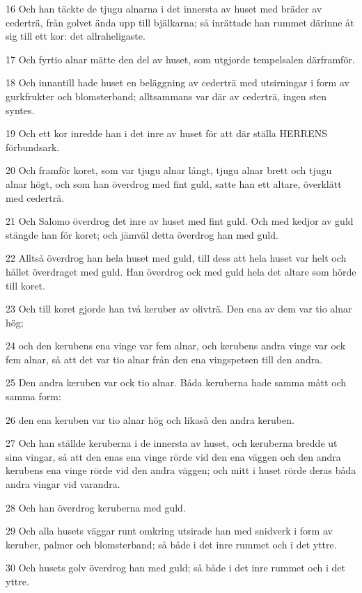 \par 16 Och han täckte de tjugu alnarna i det innersta av huset med bräder av cederträ, från golvet ända upp till bjälkarna; så inrättade han rummet därinne åt sig till ett kor: det allraheligaste.
\par 17 Och fyrtio alnar mätte den del av huset, som utgjorde tempelsalen därframför.
\par 18 Och innantill hade huset en beläggning av cederträ med utsirningar i form av gurkfrukter och blomsterband; alltsammans var där av cederträ, ingen sten syntes.
\par 19 Och ett kor inredde han i det inre av huset för att där ställa HERRENS förbundsark.
\par 20 Och framför koret, som var tjugu alnar långt, tjugu alnar brett och tjugu alnar högt, och som han överdrog med fint guld, satte han ett altare, överklätt med cederträ.
\par 21 Och Salomo överdrog det inre av huset med fint guld. Och med kedjor av guld stängde han för koret; och jämväl detta överdrog han med guld.
\par 22 Alltså överdrog han hela huset med guld, till dess att hela huset var helt och hållet överdraget med guld. Han överdrog ock med guld hela det altare som hörde till koret.
\par 23 Och till koret gjorde han två keruber av olivträ. Den ena av dem var tio alnar hög;
\par 24 och den kerubens ena vinge var fem alnar, och kerubens andra vinge var ock fem alnar, så att det var tio alnar från den ena vingspetsen till den andra.
\par 25 Den andra keruben var ock tio alnar. Båda keruberna hade samma mått och samma form:
\par 26 den ena keruben var tio alnar hög och likaså den andra keruben.
\par 27 Och han ställde keruberna i de innersta av huset, och keruberna bredde ut sina vingar, så att den enas ena vinge rörde vid den ena väggen och den andra kerubens ena vinge rörde vid den andra väggen; och mitt i huset rörde deras båda andra vingar vid varandra.
\par 28 Och han överdrog keruberna med guld.
\par 29 Och alla husets väggar runt omkring utsirade han med snidverk i form av keruber, palmer och blomsterband; så både i det inre rummet och i det yttre.
\par 30 Och husets golv överdrog han med guld; så både i det inre rummet och i det yttre.
